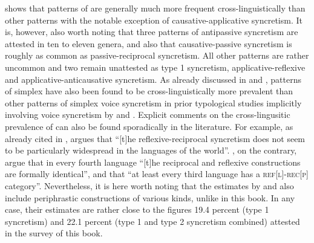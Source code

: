  shows that patterns of  are generally much more frequent cross-linguistically than other patterns with the notable exception of causative-applicative syncretism. It is, however, also worth noting that three patterns of antipassive syncretism are attested in ten to eleven genera, and also that causative-passive syncretism is roughly as common as passive-reciprocal syncretism. All other patterns are rather uncommon and two remain unattested as type 1 syncretism, applicative-reflexive and applicative-anticausative syncretism. As already discussed in  and , patterns of simplex  have also been found to be cross-linguistically more prevalent than other patterns of simplex voice syncretism in prior typological studies implicitly involving voice syncretism by \citet{geniusiene:1987} and \citet{haspelmath:1990}. Explicit comments on the cross-lingusitic prevalence of  can also be found sporadically in the literature. For example, as already cited in , \citet[66]{creissels:2016} argues that “[t]he reflexive-reciprocal syncretism does not seem to be particularly widespread in the languages of the world”. \citet[430]{maslova:nedjalkov:2005}, on the contrary, argue that in every fourth language “[t]he reciprocal and reflexive constructions are formally identical”, and \citet[171]{heine:miyashita:2008} that “at least every third language has a \textsc{ref[l]-rec[p]} category”. Nevertheless, it is here worth noting that the estimates by \citeauthor{maslova:nedjalkov:2005} and \citeauthor{heine:miyashita:2008} also include periphrastic constructions of various kinds, unlike in this book. In any case, their estimates are rather close to the figures 19.4 percent (type 1 syncretism) and 22.1 percent (type 1 and type 2 syncretism combined) attested in the survey of this book.

